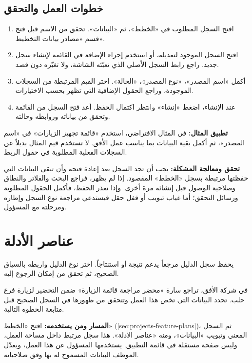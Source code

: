 \subsection{خطوات العمل والتحقق}
\begin{enumerate}
\item افتح السجل المطلوب في «الخطط»، ثم «البيانات». تحقق من الاسم قبل فتح قسم «مصادر بيانات التخطيط».
\item افتح السجل الموجود لتعديله، أو استخدم إجراء الإضافة في القائمة لإنشاء سجل جديد. راجع رابط السجل الأصلي الذي تعبّئه الشاشة، ولا تغيّره دون قصد.
\item أكمل «اسم المصدر»، «نوع المصدر»، «الحالة». اختر القيم المرتبطة من السجلات الموجودة، وراجع الحقول الإضافية التي تظهر بحسب الاختيارات.
\item عند الإنشاء، اضغط «إنشاء» وانتظر اكتمال الحفظ. أعد فتح السجل من القائمة وتحقق من بياناته وروابطه وحالته.
\end{enumerate}

\textbf{تطبيق المثال:} في المثال الافتراضي، استخدم «قائمة تجهيز الزيارات» في «اسم المصدر»، ثم أكمل بقية البيانات بما يناسب عمل الأفق. لا تستخدم قيم المثال بديلاً عن السجلات الفعلية المطلوبة في حقول الربط.

\textbf{تحقق ومعالجة المشكلة:} يجب أن تجد السجل بعد إعادة فتحه وأن تبقى البيانات التي حفظتها مرتبطة بسجل «الخطط» المقصود. إذا لم يظهر، فراجع البحث والفلاتر والنطاق وصلاحية الوصول قبل إنشائه مرة أخرى. وإذا تعذر الحفظ، فأكمل الحقول المطلوبة ورسائل التحقق؛ أما غياب تبويب أو قفل حقل فيستدعي مراجعة نوع السجل وإطاره ومرحلته مع المسؤول.

\clearpage
\section{عناصر الأدلة}
\label{sec:projects-feature-planning-evidence-items}

يحفظ سجل الدليل مرجعاً يدعم نتيجة أو استنتاجاً. اختر نوع الدليل واربطه بالسياق الصحيح، ثم تحقق من إمكان الرجوع إليه.

\begin{rcnote}
في شركة الأفق، تراجع سارة «محضر مراجعة قائمة الزيارة» ضمن التحضير لزيارة فرع حلب. تحدد البيانات التي تخص هذا العمل وتتحقق من ظهورها في السجل الصحيح قبل متابعة الخطوة التالية.
\end{rcnote}

\textbf{المسار ومن يستخدمه:} افتح «الخطط» (\ref{sec:projects-feature-plans})، ثم السجل المعني وتبويب «البيانات»، ومنه «عناصر الأدلة». هذا سجل مرتبط داخل مساحة العمل، وليس صفحة مستقلة في قائمة التطبيق. يستخدمها المسؤول عن هذا العمل، ويعدّل الموظف البيانات المسموح له بها وفق صلاحياته.

